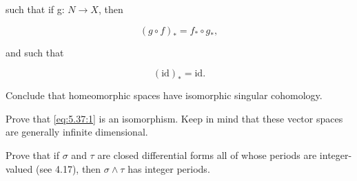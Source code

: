 \begin{problemset}
such that if g:  $ N \to X $, then

\[
(g\circ f)_{*}=f_{*}\circ g_{*},
\]

and such that

\[
(\mathrm{id})_{*}=\mathrm{id}.
\]

Conclude that homeomorphic spaces have isomorphic singular cohomology.

\item Prove that \eqref{eq:5.37:1} is an isomorphism. Keep in mind that these vector spaces are generally infinite dimensional.

\item Prove that if $\sigma$ and $\tau$ are closed differential forms all of whose periods are integer-valued (see 4.17), then $\sigma \wedge \tau$ has integer periods.

\end{problemset}
